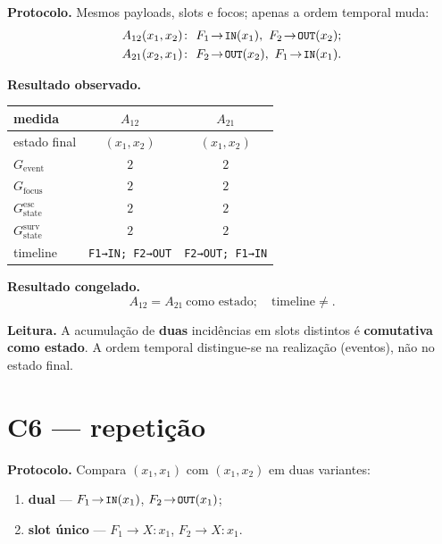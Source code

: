 \documentclass[11pt,a4paper]{article}
\newcommand{\code}[1]{\texttt{\small #1}}
\begin{document}
\noindent\textbf{Protocolo.} Mesmos payloads, slots e focos; apenas a ordem temporal
muda:
\begin{align*}
A_{12}(x_1,x_2)&\colon\ F_1\!\to\!\code{IN}(x_1),\ F_2\!\to\!\code{OUT}(x_2);\\
A_{21}(x_2,x_1)&\colon\ F_2\!\to\!\code{OUT}(x_2),\ F_1\!\to\!\code{IN}(x_1).
\end{align*}

\medskip\noindent\textbf{Resultado observado.}
\begin{center}\footnotesize
\begin{tabular}{@{}lcc@{}}
\toprule
medida & $A_{12}$ & $A_{21}$ \\
\midrule
estado final & $(x_1,x_2)$ & $(x_1,x_2)$ \\
$G_{\mathrm{event}}$ & $2$ & $2$ \\
$G_{\mathrm{focus}}$ & $2$ & $2$ \\
$G_{\mathrm{state}}^{\mathrm{esc}}$ & $2$ & $2$ \\
$G_{\mathrm{state}}^{\mathrm{surv}}$ & $2$ & $2$ \\
timeline & \code{F1→IN; F2→OUT} & \code{F2→OUT; F1→IN} \\
\bottomrule
\end{tabular}
\end{center}

\medskip\noindent\textbf{Resultado congelado.}
\[
\boxed{A_{12}=A_{21}\ \text{como estado};\quad\text{timeline}\neq.}
\]

\medskip\noindent\textbf{Leitura.} A acumulação de \textbf{duas} incidências em slots
distintos é \textbf{comutativa como estado}. A ordem temporal distingue-se na
realização (eventos), não no estado final.

\section{C6 --- repetição}\label{comb:c6}

\noindent\textbf{Protocolo.} Compara $(x_1,x_1)$ com $(x_1,x_2)$ em duas variantes:
\begin{enumerate}\itemsep2pt
\item \textbf{dual} --- $F_1\!\to\!\code{IN}(x_1)$, $F_2\!\to\!\code{OUT}(x_1)$;
\item \textbf{slot único} --- $F_1\!\to\!X\colon x_1$, $F_2\!\to\!X\colon x_1$.
\end{enumerate}
\end{document}
